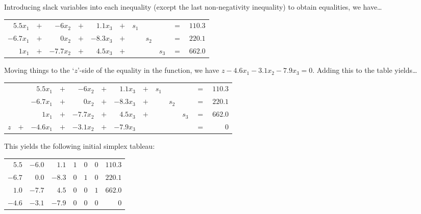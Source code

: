 \documentclass[11pt,letterpaper]{article}
\begin{document}
\sol Introducing slack variables into each inequality (except the last non-negativity inequality) to obtain equalities, we have\dots \par
	\begin{table}[!ht]
	\centering
	\begin{tabular}{rrrrrrrrrrr}
	$5.5x_1$ & $+$ & $-6x_2$ & $+$ & $1.1x_3$ & $+$ & $s_1$ & & & $=$ & $110.3$ \\
	$-6.7x_1$ & $+$ & $0x_2$ & $+$ & $-8.3x_3$ & $+$ & & $s_2$ & & $=$ & $220.1$ \\
	$1x_1$ & $+$ & $-7.7x_2$ & $+$ & $4.5x_3$ & $+$ & & & $s_3$ & $=$ & $662.0$
	\end{tabular}
	\end{table} \par
Moving things to the `$z$'-side of the equality in the function, we have $z - 4.6x_1 - 3.1x_2 - 7.9x_3= 0$. Adding this to the table yields\dots \par
	\begin{table}[!ht]
	\centering
	\begin{tabular}{rrrrrrrrrrrrr}
	&& $5.5x_1$ & $+$ & $-6x_2$ & $+$ & $1.1x_3$ & $+$ & $s_1$ & & & $=$ & $110.3$ \\
	&& $-6.7x_1$ & $+$ & $0x_2$ & $+$ & $-8.3x_3$ & $+$ & & $s_2$ & & $=$ & $220.1$ \\
	&& $1x_1$ & $+$ & $-7.7x_2$ & $+$ & $4.5x_3$ & $+$ & & & $s_3$ & $=$ & $662.0$ \\
	$z$ & $+$ & $-4.6x_1$ & $+$ & $-3.1x_2$ & $+$ & $-7.9x_3$ & & & & & $=$ & $0$
	\end{tabular}
	\end{table} \par
This yields the following initial simplex tableau: \par
	\begin{table}[!ht]
	\centering
	\begin{tabular}{rrrrrr|r}
	$5.5$ & $-6.0$ & $1.1$ & $1$ & $0$ & $0$ & $110.3$ \\ 
	$-6.7$ & $0.0$ & $-8.3$ & $0$ & $1$ & $0$ & $220.1$ \\ 
	$1.0$ & $-7.7$ & $4.5$ & $0$ & $0$ & $1$ & $662.0$ \\ \hline
	$-4.6$ & $-3.1$ & $-7.9$ & $0$ & $0$ & $0$ & $0$ \\ 
	\end{tabular}
	\end{table}
	


\newpage
\end{document}
